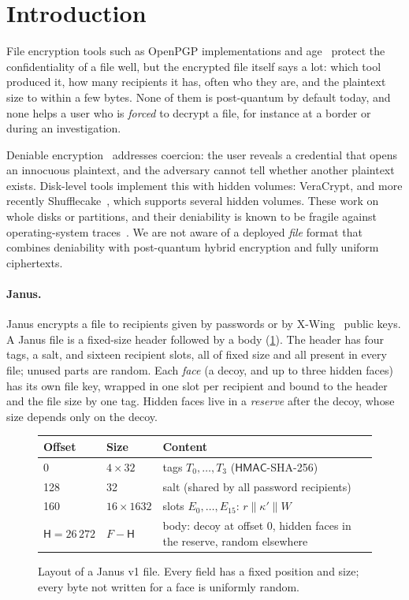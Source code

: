 \documentclass[11pt,a4paper]{article}
\theoremstyle{definition}
\theoremstyle{remark}
\newcommand{\Hdr}{\mathsf{H}}
\newcommand{\HMAC}{\mathsf{HMAC}}
\begin{document}
\section{Introduction}

File encryption tools such as OpenPGP implementations and age~\cite{age} protect the confidentiality of a file well, but the encrypted file itself says a lot: which tool produced it, how many recipients it has, often who they are, and the plaintext size to within a few bytes. None of them is post-quantum by default today, and none helps a user who is \emph{forced} to decrypt a file, for instance at a border or during an investigation.

Deniable encryption~\cite{CDNO97} addresses coercion: the user reveals a credential that opens an innocuous plaintext, and the adversary cannot tell whether another plaintext exists. Disk-level tools implement this with hidden volumes: VeraCrypt, and more recently Shufflecake~\cite{shufflecake}, which supports several hidden volumes. These work on whole disks or partitions, and their deniability is known to be fragile against operating-system traces~\cite{CzeskisEtAl08}. We are not aware of a deployed \emph{file} format that combines deniability with post-quantum hybrid encryption and fully uniform ciphertexts.

\paragraph{Janus.} Janus encrypts a file to recipients given by passwords or by X-Wing~\cite{xwing} public keys. A Janus file is a fixed-size header followed by a body (\cref{fig:layout}). The header has four tags, a salt, and sixteen recipient slots, all of fixed size and all present in every file; unused parts are random. Each \emph{face} (a decoy, and up to three hidden faces) has its own file key, wrapped in one slot per recipient and bound to the header and the file size by one tag. Hidden faces live in a \emph{reserve} after the decoy, whose size depends only on the decoy.

\begin{figure}[t]
\centering
\begin{tabular}{@{}llp{7.6cm}@{}}
\toprule
Offset & Size & Content \\
\midrule
0 & $4\times 32$ & tags $T_0,\dots,T_3$ ($\HMAC$-SHA-256) \\
128 & 32 & salt (shared by all password recipients) \\
160 & $16\times 1632$ & slots $E_0,\dots,E_{15}$: $r \| \kappa' \| W$ \\
$\Hdr = 26\,272$ & $F-\Hdr$ & body: decoy at offset 0, hidden faces in the reserve, random elsewhere \\
\bottomrule
\end{tabular}
\caption{Layout of a Janus v1 file. Every field has a fixed position and size; every byte not written for a face is uniformly random.}
\label{fig:layout}
\end{figure}
\end{document}
